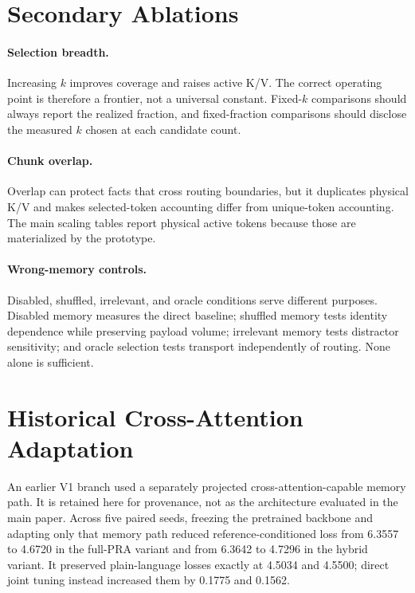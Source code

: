 \documentclass[11pt]{article}
\begin{document}
\appendix

\section{Secondary Ablations}
\label{app:ablations}

\paragraph{Selection breadth.}
Increasing $k$ improves coverage and raises active K/V.
The correct operating point is therefore a frontier, not a universal constant.
Fixed-$k$ comparisons should always report the realized fraction,
and fixed-fraction comparisons should disclose the measured $k$ chosen at each candidate
count.

\paragraph{Chunk overlap.}
Overlap can protect facts that cross routing boundaries,
but it duplicates physical K/V and makes selected-token accounting differ from
unique-token accounting. The main scaling tables report physical active tokens because
those are materialized by the prototype.

\paragraph{Wrong-memory controls.}
Disabled, shuffled, irrelevant, and oracle conditions serve different purposes.
Disabled memory measures the direct baseline; shuffled memory tests identity dependence
while preserving payload volume; irrelevant memory tests distractor sensitivity;
and oracle selection tests transport independently of routing. None alone is sufficient.

\section{Historical Cross-Attention Adaptation}
\label{app:adaptation}

An earlier V1 branch used a separately projected cross-attention-capable memory path.
It is retained here for provenance, not as the architecture evaluated in the main paper.
Across five paired seeds, freezing the pretrained backbone and adapting only that memory
path reduced reference-conditioned loss from 6.3557 to 4.6720 in the full-PRA variant
and from 6.3642 to 4.7296 in the hybrid variant.
It preserved plain-language losses exactly at 4.5034 and 4.5500;
direct joint tuning instead increased them by 0.1775 and 0.1562.
\end{document}
